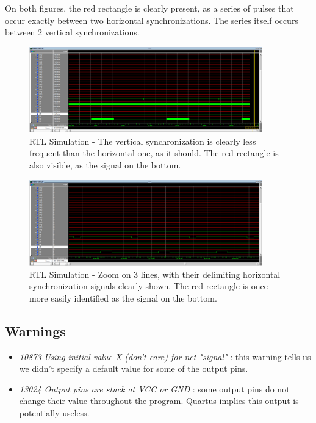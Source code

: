 \documentclass[12pt,a4paper,hyperlinks]{rapport_unif}
\begin{document}
On both figures, the red rectangle is clearly present, as a series of pulses that occur exactly between two horizontal synchronizations. The series itself occurs between 2 vertical synchronizations. 

\begin{figure}[htp]
\centering
	\includegraphics[width=0.9\textwidth]{figures/simu1}
	\caption{RTL Simulation - The vertical synchronization is clearly less frequent than the horizontal one, as it should. The red rectangle is also visible, as the signal on the bottom.}
	\label{fig:sim1}
\end{figure}

\begin{figure}[htp]
\centering
	\includegraphics[width=0.9\textwidth]{figures/simu2}
	\caption{RTL Simulation - Zoom on 3 lines, with their delimiting horizontal synchronization signals clearly shown. The red rectangle is once more easily identified as the signal on the bottom.}
	\label{fig:sim2}
\end{figure}

\subsection{Warnings}
\begin{itemize}
\item \emph{10873 Using initial value X (don't care) for net "signal"} : this warning tells us we didn't specify a default value for some of the output pins.
\item \emph{13024 Output pins are stuck at VCC or GND} : some output pins do not change their value throughout the program. Quartus implies this output is potentially useless.
\end{itemize}
\end{document}
